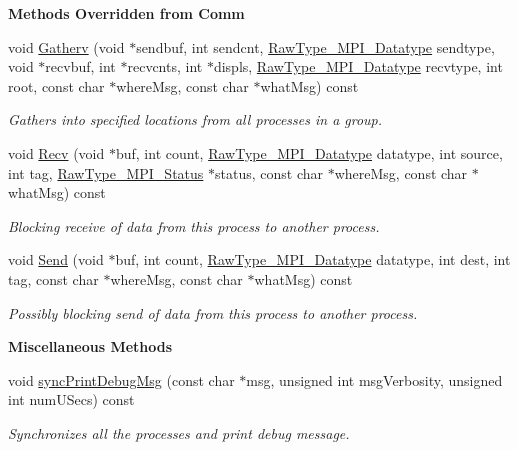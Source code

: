 \begin{Indent}{\bf Methods Overridden from Comm}
\begin{DoxyCompactItemize}
void \hyperlink{class_q_u_e_s_o_1_1_mpi_comm_a9313449240c1bb2289870309a5c711ed}{Gatherv} (void $\ast$sendbuf, int sendcnt, \hyperlink{namespace_q_u_e_s_o_a8648edf143b92c6f21f6cb93223b2cc9}{Raw\-Type\-\_\-\-M\-P\-I\-\_\-\-Datatype} sendtype, void $\ast$recvbuf, int $\ast$recvcnts, int $\ast$displs, \hyperlink{namespace_q_u_e_s_o_a8648edf143b92c6f21f6cb93223b2cc9}{Raw\-Type\-\_\-\-M\-P\-I\-\_\-\-Datatype} recvtype, int root, const char $\ast$where\-Msg, const char $\ast$what\-Msg) const 
\begin{DoxyCompactList}\small\item\em Gathers into specified locations from all processes in a group. \end{DoxyCompactList}\item 
void \hyperlink{class_q_u_e_s_o_1_1_mpi_comm_a12d7a87a4407e442c35a17d3caaf46c1}{Recv} (void $\ast$buf, int count, \hyperlink{namespace_q_u_e_s_o_a8648edf143b92c6f21f6cb93223b2cc9}{Raw\-Type\-\_\-\-M\-P\-I\-\_\-\-Datatype} datatype, int source, int tag, \hyperlink{namespace_q_u_e_s_o_af3c313103c6396188748a1d534577ff7}{Raw\-Type\-\_\-\-M\-P\-I\-\_\-\-Status} $\ast$status, const char $\ast$where\-Msg, const char $\ast$what\-Msg) const 
\begin{DoxyCompactList}\small\item\em Blocking receive of data from this process to another process. \end{DoxyCompactList}\item 
void \hyperlink{class_q_u_e_s_o_1_1_mpi_comm_a1ecdbeac992a2ab1ff12e45e0c1b53b4}{Send} (void $\ast$buf, int count, \hyperlink{namespace_q_u_e_s_o_a8648edf143b92c6f21f6cb93223b2cc9}{Raw\-Type\-\_\-\-M\-P\-I\-\_\-\-Datatype} datatype, int dest, int tag, const char $\ast$where\-Msg, const char $\ast$what\-Msg) const 
\begin{DoxyCompactList}\small\item\em Possibly blocking send of data from this process to another process. \end{DoxyCompactList}\end{DoxyCompactItemize}
\end{Indent}
\begin{Indent}{\bf Miscellaneous Methods}\par
\begin{DoxyCompactItemize}
\item 
void \hyperlink{class_q_u_e_s_o_1_1_mpi_comm_a6f73891de4668c325277ddaa799cf808}{sync\-Print\-Debug\-Msg} (const char $\ast$msg, unsigned int msg\-Verbosity, unsigned int num\-U\-Secs) const 
\begin{DoxyCompactList}\small\item\em Synchronizes all the processes and print debug message. \end{DoxyCompactList}\end{DoxyCompactItemize}
\end{Indent}
